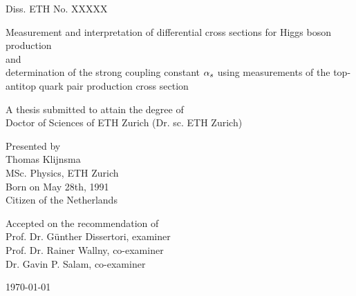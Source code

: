 \documentclass[draftmode]{main}
\begin{document}
\begin{center}
\Large Diss. ETH No. XXXXX
\end{center}

\vspace{3cm}
\begin{center}
\huge
Measurement and interpretation of differential cross sections for Higgs boson production
\\
and
\\
determination of the strong coupling constant $\alpha_s$ using measurements of the top-antitop quark pair production cross section\par
\end{center}

\vspace{1cm}
\begin{center}
\large
A thesis submitted to attain the degree of \\
Doctor of Sciences of ETH Zurich (Dr. sc. ETH Zurich)
\end{center}

\vspace{1cm}
\begin{center}
\large
Presented by \\[10pt]
{\huge Thomas Klijnsma} \\[10pt]
MSc. Physics, ETH Zurich \\
Born on May 28th, 1991 \\
Citizen of the Netherlands\par
\end{center}

\vspace{1cm}
\begin{center}
\large
Accepted on the recommendation of \\[5pt]
Prof. Dr. G{\"u}nther Dissertori, examiner \\
Prof. Dr. Rainer Wallny, co-examiner \\
Dr. Gavin P. Salam, co-examiner\par
\end{center}

\vspace{1cm}
\begin{center}
\large
\today
\end{center}

\thispagestyle{empty} %
\null\newpage\thispagestyle{empty}\null %
\end{document}
